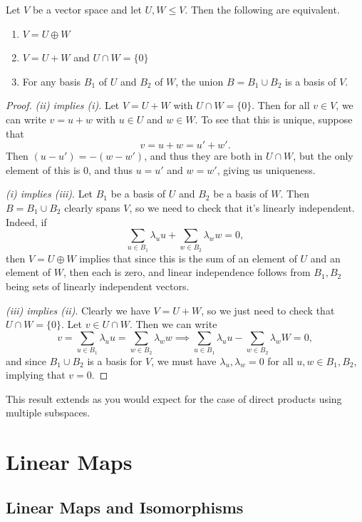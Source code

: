 \begin{lemma}
    Let $V$ be a vector space and let $U, W \leq V$.
    Then the following are equivalent.
    \begin{enumerate}[label=(\roman*)]
        \item $V = U \oplus W$
        \item $V = U + W$ and $U \cap W = \{0\}$
        \item For any basis $B_1$ of $U$ and $B_2$ of $W$, the union $B = B_1 \cup B_2$ is a basis of $V$.
    \end{enumerate}
\end{lemma}
\begin{proof}
    \emph{(ii) implies (i)}. Let $V = U + W$ with $U \cap W = \{0\}$. Then for all $v \in V$, we can write $v = u + w$ with $u \in U$ and $w \in W$. To see that this is unique, suppose that
    $$
    v = u + w = u' + w'.
    $$
    Then $(u - u') = - (w-w')$, and thus they are both in $U \cap W$, but the only element of this is $0$, and thus $u = u'$ and $w = w'$, giving us uniqueness.

    \emph{(i) implies (iii)}. Let $B_1$ be a basis of $U$ and $B_2$ be a basis of $W$. Then $B = B_1 \cup B_2$ clearly spans $V$, so we need to check that it's linearly independent. Indeed, if
    $$
    \sum_{u \in B_1} \lambda_u u + \sum_{w \in B_2} \lambda_w w = 0,
    $$
    then $V = U \oplus W$ implies that since this is the sum of an element of $U$ and an element of $W$, then each is zero, and linear independence follows from $B_1, B_2$ being sets of linearly independent vectors.

    \emph{(iii) implies (ii)}. 
    Clearly we have $V = U+W$, so we just need to check that $U \cap W = \{0\}$. Let $v \in U \cap W$. Then we can write
    $$
    v = \sum_{u \in B_1} \lambda_u u = \sum_{w \in B_2} \lambda_w w \implies \sum_{u \in B_1} \lambda_u u - \sum_{w \in B_2} \lambda_w W = 0,
    $$
    and since $B_1 \cup B_2$ is a basis for $V$, we must have $\lambda_u, \lambda_w = 0$ for all $u, w \in B_1, B_2$, implying that $v = 0$.
\end{proof}

This result extends as you would expect for the case of direct products using multiple subspaces.

\section{Linear Maps}

\subsection{Linear Maps and Isomorphisms}

